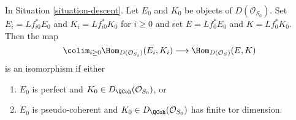 \begin{lemma}
\label{lemma-descend-homomorphisms}
In Situation \ref{situation-descent}.
Let $E_0$ and $K_0$ be objects of
$D(\mathcal{O}_{S_0})$.
Set $E_i = Lf_{i0}^*E_0$ and $K_i = Lf_{i0}^*K_0$ for $i \geq 0$
and set $E = Lf_0^*E_0$ and $K = Lf_0^*K_0$. Then the map
$$
\colim_{i \geq 0} \Hom_{D(\mathcal{O}_{S_i})}(E_i, K_i)
\longrightarrow
\Hom_{D(\mathcal{O}_S)}(E, K)
$$
is an isomorphism if either
\begin{enumerate}
\item $E_0$ is perfect and $K_0 \in D_\QCoh(\mathcal{O}_{S_0})$, or
\item $E_0$ is pseudo-coherent and
$K_0 \in D_\QCoh(\mathcal{O}_{S_0})$ has finite tor dimension.
\end{enumerate}
\end{lemma}

